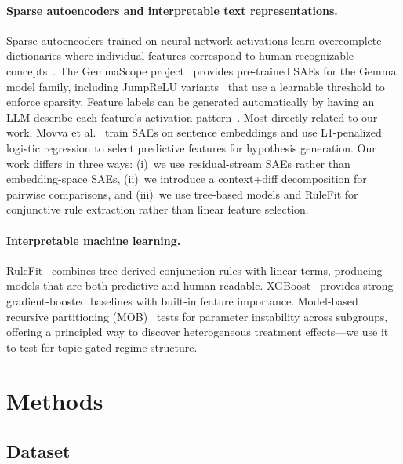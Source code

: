 \documentclass[sigconf,natbib=false, language=english]{acmart}
\begin{document}
\paragraph{Sparse autoencoders and interpretable text representations.}
Sparse autoencoders trained on neural network activations learn overcomplete dictionaries where individual features correspond to human-recognizable concepts~\cite{bricken2023monosemanticity, cunningham2023sparse}. The GemmaScope project~\cite{lieberum2024gemma} provides pre-trained SAEs for the Gemma model family, including JumpReLU variants~\cite{rajamanoharan2024jumping} that use a learnable threshold to enforce sparsity. Feature labels can be generated automatically by having an LLM describe each feature's activation pattern~\cite{bills2023language}. Most directly related to our work, Movva et al.~\cite{movva2025hypothesaes} train SAEs on sentence embeddings and use L1-penalized logistic regression to select predictive features for hypothesis generation. Our work differs in three ways: (i)~we use residual-stream SAEs rather than embedding-space SAEs, (ii)~we introduce a context+diff decomposition for pairwise comparisons, and (iii)~we use tree-based models and RuleFit for conjunctive rule extraction rather than linear feature selection.

\paragraph{Interpretable machine learning.}
RuleFit~\cite{friedman2008rulefit} combines tree-derived conjunction rules with linear terms, producing models that are both predictive and human-readable. XGBoost~\cite{chen2016xgboost} provides strong gradient-boosted baselines with built-in feature importance. Model-based recursive partitioning (MOB)~\cite{zeileis2008mob} tests for parameter instability across subgroups, offering a principled way to discover heterogeneous treatment effects---we use it to test for topic-gated regime structure.

\section{Methods}

\subsection{Dataset}
\end{document}
